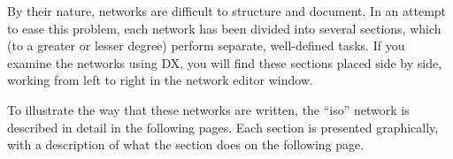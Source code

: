 By their nature, networks are difficult to structure and document. In an
attempt to ease this problem, each network has been divided into several
sections, which (to a greater or lesser degree) perform separate,
well-defined tasks. If you examine the networks using DX, you will find
these sections placed side by side, working from left to right in the
network editor window.

To illustrate the way that these networks are written, the ``iso''
network is described in detail in the following pages. Each section is
presented graphically, with a description of what the section does on
the following page.


